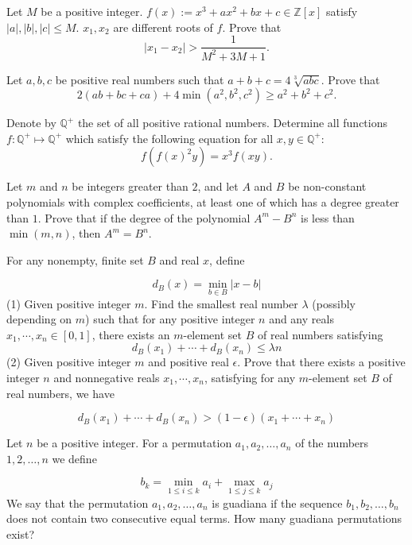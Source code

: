 \documentclass[11pt]{scrartcl}
\begin{document}
\begin{problem}[327692898213057]
Let $M$ be a positive integer. $f(x):=x^3+ax^2+bx+c\in\mathbb Z[x]$ satisfy $|a|,|b|,|c|\le M.$ $x_1,x_2$ are different roots of $f.$ Prove that$$|x_1-x_2|>\frac 1{M^2+3M+1}.$$
\end{problem}
\begin{problem}[329519083206921]
Let \(a,b,c\) be positive real numbers such that \(a+b+c=4\sqrt[3]{abc}\). Prove that\[2(ab+bc+ca)+4\min(a^2,b^2,c^2)\ge a^2+b^2+c^2.\]
\end{problem}
\begin{problem}[340033255492200]
Denote by $\mathbb{Q}^+$ the set of all positive rational numbers. Determine all functions $f : \mathbb{Q}^+ \mapsto \mathbb{Q}^+$ which satisfy the following equation for all $x, y \in \mathbb{Q}^+:$\[f\left( f(x)^2y \right) = x^3 f(xy).\]
\end{problem}
\begin{problem}[344307741773187]
Let $m$ and $n$ be integers greater than $2$, and let $A$ and $B$ be non-constant polynomials with complex coefficients, at least one of which has a degree greater than $1$. Prove that if the degree of the polynomial $A^m-B^n$ is less than $\min(m,n)$, then $A^m=B^n$.
\end{problem}
\begin{problem}[346260797892858]
For any nonempty, finite set $B$ and real $x$, define

$$d_B(x) = \min_{b\in B} |x-b|$$
(1) Given positive integer $m$. Find the smallest real number $\lambda$ (possibly depending on $m$) such that for any positive integer $n$ and any reals $x_1,\cdots,x_n \in [0,1]$, there exists an $m$-element set $B$ of real numbers satisfying$$d_B(x_1)+\cdots+d_B(x_n) \le \lambda n$$
(2) Given positive integer $m$ and positive real $\epsilon$. Prove that there exists a positive integer $n$ and nonnegative reals $x_1,\cdots,x_n$, satisfying for any $m$-element set $B$ of real numbers, we have

$$d_B(x_1)+\cdots+d_B(x_n) > (1-\epsilon)(x_1+\cdots+x_n)$$
\end{problem}
\begin{problem}[351896324490208]
Let $n$ be a positive integer. For a permutation $a_1, a_2, \dots, a_n$ of the numbers $1, 2, \dots, n$ we define

$$b_k = \min_{1 \leq i \leq k} a_i + \max_{1 \leq j \leq k} a_j$$
We say that the permutation $a_1, a_2, \dots, a_n$ is guadiana if the sequence $b_1, b_2, \dots, b_n$ does not contain two consecutive equal terms. How many guadiana permutations exist?
\end{problem}
\end{document}
